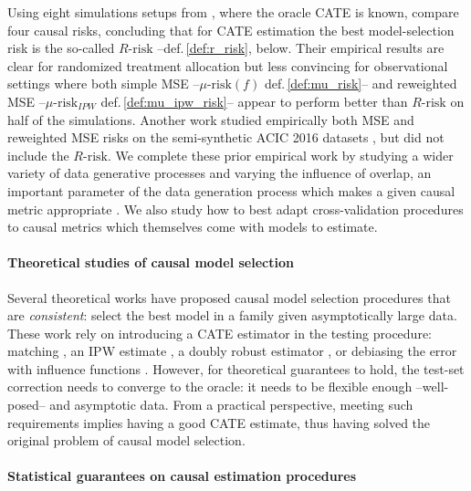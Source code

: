 \documentclass[a4paper,num-refs]{oup-contemporary}%
\begin{document}
Using eight simulations setups from \cite{powers_methods_2018}, where
the oracle CATE is known, \cite{schuler_comparison_2018} compare four
causal risks, concluding that for CATE estimation the best
model-selection risk is the so-called $R\text{-risk}$
\cite{nie_quasioracle_2017} --def.\,\ref{def:r_risk}, below. Their
empirical results are clear for randomized treatment allocation but less
convincing for observational settings where both simple MSE --$\mu\text{-risk}(f)$ def.\,\ref{def:mu_risk}-- and
reweighted MSE --$\mu\text{-risk}_{IPW}$ def.\,\ref{def:mu_ipw_risk}--
appear to perform better than $R\text{-risk}$ on half of the simulations.
Another work \cite{alaa_validating_2019} studied empirically both MSE and
reweighted MSE risks on the semi-synthetic ACIC 2016 datasets
\cite{dorie_automated_2019}, but did not include the $R\text{-risk}$. We complete these
prior empirical work by studying a wider variety of data generative
processes and varying the influence of overlap, an important parameter of
the data generation process which makes a given causal metric appropriate
\cite{damour_overlap_2020}. We also study how to best adapt
cross-validation procedures to causal metrics which themselves come with
models to estimate.

\paragraph{Theoretical studies of causal model selection}

Several theoretical works have proposed causal model selection procedures
that are \emph{consistent}: select the best model in a family given
asymptotically large data. These work rely on introducing a
CATE estimator in the testing procedure: matching
\cite{rolling_model_2014}, an IPW estimate
\cite{gutierrez_causal_2016}, a doubly robust estimator
\cite{saito_counterfactual_2020}, or debiasing the error with influence
functions \cite{alaa_validating_2019}. However, for theoretical
guarantees to hold, the test-set correction needs to converge to the
oracle: it needs to be flexible enough --well-posed-- and asymptotic
data. From a practical perspective, meeting such requirements
implies having a good CATE estimate, thus having solved
the original problem of causal model selection.

\paragraph{Statistical guarantees on causal estimation procedures}
\end{document}
